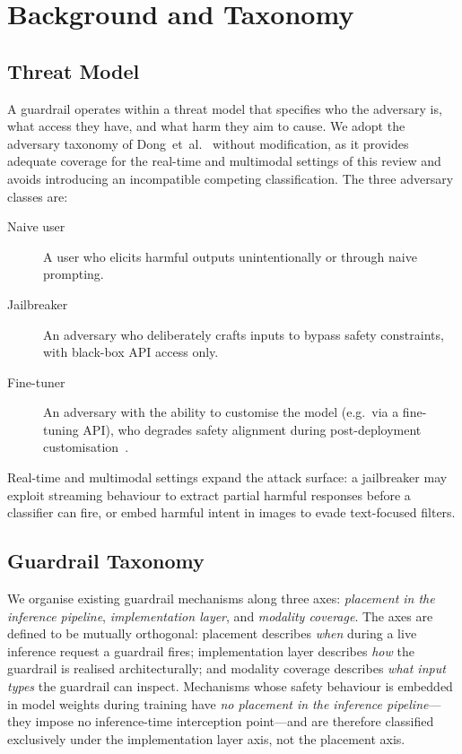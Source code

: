 \section{Background and Taxonomy}
\label{sec:background}

\subsection{Threat Model}

A guardrail operates within a threat model that specifies who the adversary is,
what access they have, and what harm they aim to cause.
We adopt the adversary taxonomy of Dong~et~al.~\cite{dong2024building} without
modification, as it provides adequate coverage for the real-time and multimodal
settings of this review and avoids introducing an incompatible competing
classification.
The three adversary classes are:

\begin{description}
  \item[Naive user] A user who elicits harmful outputs unintentionally or through
        naive prompting.
  \item[Jailbreaker] An adversary who deliberately crafts inputs to bypass safety
        constraints, with black-box API access only.
  \item[Fine-tuner] An adversary with the ability to customise the model (e.g.\ via a
        fine-tuning API), who degrades safety alignment during post-deployment
        customisation~\cite{qi2023finetuning}.
\end{description}

Real-time and multimodal settings expand the attack surface: a jailbreaker may
exploit streaming behaviour to extract partial harmful responses before a classifier
can fire, or embed harmful intent in images to evade text-focused filters.

\subsection{Guardrail Taxonomy}

We organise existing guardrail mechanisms along three axes:
\emph{placement in the inference pipeline}, \emph{implementation layer}, and
\emph{modality coverage}.
The axes are defined to be mutually orthogonal: placement describes \emph{when}
during a live inference request a guardrail fires; implementation layer describes
\emph{how} the guardrail is realised architecturally; and modality coverage
describes \emph{what input types} the guardrail can inspect.
Mechanisms whose safety behaviour is embedded in model weights during training
have \emph{no placement in the inference pipeline}---they impose no inference-time
interception point---and are therefore classified exclusively under the
implementation layer axis, not the placement axis.

